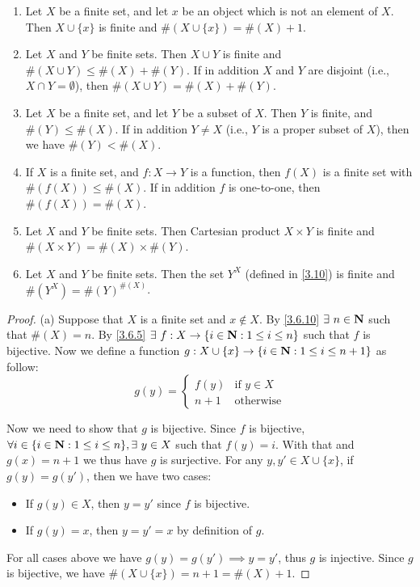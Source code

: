 \begin{proposition}\label{3.6.14}
  \leavevmode
  \begin{enumerate}
    \item Let \(X\) be a finite set, and let \(x\) be an object which is not an element of \(X\).
          Then \(X \cup \{x\}\) is finite and \(\#(X \cup \{x\}) = \#(X) + 1\).
    \item Let \(X\) and \(Y\) be finite sets.
          Then \(X \cup Y\) is finite and \(\#(X \cup Y) \leq \#(X) + \#(Y)\).
          If in addition \(X\) and \(Y\) are disjoint (i.e., \(X \cap Y = \emptyset\)), then \(\#(X \cup Y) = \#(X) + \#(Y)\).
    \item Let \(X\) be a finite set, and let \(Y\) be a subset of \(X\).
          Then \(Y\) is finite, and \(\#(Y) \leq \#(X)\).
          If in addition \(Y \neq X\) (i.e., \(Y\) is a proper subset of \(X\)), then we have \(\#(Y) < \#(X)\).
    \item If \(X\) is a finite set, and \(f : X \to Y\) is a function, then \(f(X)\) is a finite set with \(\#(f(X)) \leq \#(X)\).
          If in addition \(f\) is one-to-one, then \(\#(f(X)) = \#(X)\).
    \item Let \(X\) and \(Y\) be finite sets.
          Then Cartesian product \(X \times Y\) is finite and \(\#(X \times Y) = \#(X) \times \#(Y)\).
    \item Let \(X\) and \(Y\) be finite sets.
          Then the set \(Y^X\) (defined in \cref{3.10}) is finite and \(\#(Y^X) = \#(Y)^{\#(X)}\).
  \end{enumerate}
\end{proposition}

\begin{proof}{(a)}
  Suppose that \(X\) is a finite set and \(x \notin X\).
  By \cref{3.6.10} \(\exists\ n \in \N\) such that \(\#(X) = n\).
  By \cref{3.6.5} \(\exists\ f : X \to \{i \in \mathbf{N} : 1 \leq i \leq n\}\) such that \(f\) is bijective.
  Now we define a function \(g : X \cup \{x\} \to \{i \in \mathbf{N} : 1 \leq i \leq n + 1\}\) as follow:
  \[
    g(y) = \begin{cases}
      f(y)  & \text{if } y \in X \\
      n + 1 & \text{otherwise}
    \end{cases}
  \]

  Now we need to show that \(g\) is bijective.
  Since \(f\) is bijective, \(\forall i \in \{i \in \mathbf{N} : 1 \leq i \leq n\}, \exists\ y \in X\) such that \(f(y) = i\).
  With that and \(g(x) = n + 1\) we thus have \(g\) is surjective.
  For any \(y, y' \in X \cup \{x\}\), if \(g(y) = g(y')\), then we have two cases:
  \begin{itemize}
    \item If \(g(y) \in X\), then \(y = y'\) since \(f\) is bijective.
    \item If \(g(y) = x\), then \(y = y' = x\) by definition of \(g\).
  \end{itemize}
  For all cases above we have \(g(y) = g(y') \implies y = y'\), thus \(g\) is injective.
  Since \(g\) is bijective, we have \(\#(X \cup \{x\}) = n + 1 = \#(X) + 1\).
\end{proof}

